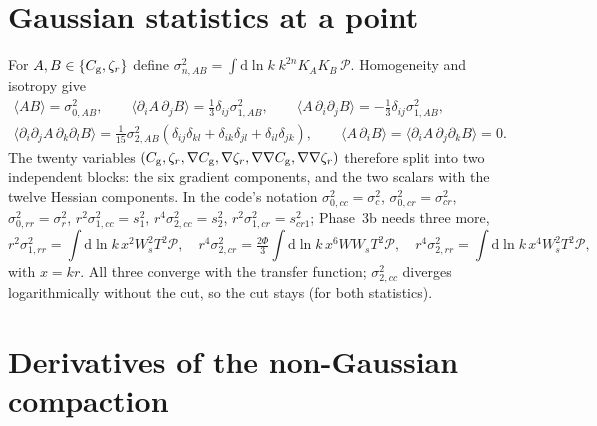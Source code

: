 \documentclass[11pt]{article}
\newcommand{\Cg}{C_{\rm g}}
\newcommand{\zr}{\zeta_r}
\newcommand{\dd}{\mathrm{d}}
\begin{document}
\section{Gaussian statistics at a point}

For $A,B\in\{\Cg,\zr\}$ define $\sigma^2_{n,AB}=\int\dd\ln k\;k^{2n}K_AK_B\,\mathcal P$.
Homogeneity and isotropy give
\begin{gather}
\langle AB\rangle=\sigma^2_{0,AB},\qquad
\langle\partial_iA\,\partial_jB\rangle=\tfrac13\delta_{ij}\sigma^2_{1,AB},\qquad
\langle A\,\partial_i\partial_jB\rangle=-\tfrac13\delta_{ij}\sigma^2_{1,AB},\nonumber\\
\langle\partial_i\partial_jA\,\partial_k\partial_lB\rangle=
\tfrac1{15}\sigma^2_{2,AB}(\delta_{ij}\delta_{kl}+\delta_{ik}\delta_{jl}+\delta_{il}\delta_{jk}),\qquad
\langle A\,\partial_iB\rangle=\langle\partial_iA\,\partial_j\partial_kB\rangle=0 .
\label{eq:corr}
\end{gather}
The twenty variables $(\Cg,\zr,\nabla\Cg,\nabla\zr,\nabla\nabla\Cg,\nabla\nabla\zr)$ therefore
split into two independent blocks: the six gradient components, and the two scalars with the
twelve Hessian components. In the code's notation $\sigma^2_{0,cc}=\sigma_c^2$,
$\sigma^2_{0,cr}=\sigma_{cr}^2$, $\sigma^2_{0,rr}=\sigma_r^2$, $r^2\sigma^2_{1,cc}=s_1^2$,
$r^4\sigma^2_{2,cc}=s_2^2$, $r^2\sigma^2_{1,cr}=s_{cr1}^2$; Phase~3b needs three more,
\begin{equation}
r^2\sigma^2_{1,rr}=\int\dd\ln k\,x^2W_s^2T^2\mathcal P,\quad
r^4\sigma^2_{2,cr}=\tfrac{2\Phi}{3}\int\dd\ln k\,x^6WW_sT^2\mathcal P,\quad
r^4\sigma^2_{2,rr}=\int\dd\ln k\,x^4W_s^2T^2\mathcal P,
\label{eq:newmoments}
\end{equation}
with $x=kr$. All three converge with the transfer function; $\sigma^2_{2,cc}$ diverges
logarithmically without the cut, so the cut stays (for both statistics).

\section{Derivatives of the non-Gaussian compaction}
\end{document}
